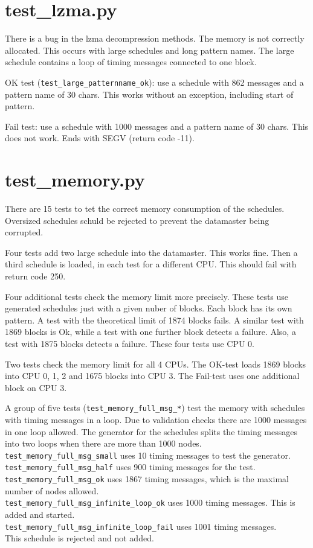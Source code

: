 \documentclass[12pt,a4paper]{report}
\begin{document}
\section{test\_lzma.py}
There is a bug in the lzma decompression methods. The memory is not correctly allocated.
This occurs with large schedules and long pattern names. The large schedule contains
a loop of timing messages connected to one block.

OK test (\texttt{test\_large\_patternname\_ok}): use a schedule with 862 messages and a pattern name of 30 chars.
This works without an exception, including start of pattern.

Fail test: use a schedule with 1000 messages and a pattern name of 30 chars.
This does not work. Ends with SEGV (return code -11).

\section{test\_memory.py}
There are 15 tests to tet the correct memory consumption of the schedules.
Oversized schedules schuld be rejected to prevent the datamaster being corrupted.

Four tests add two large schedule into the datamaster. This works fine.
Then a third schedule is loaded, in each test for a different CPU. This
should fail with return code 250.

Four additional tests check the memory limit more precisely. These tests
use generated schedules just with a given nuber of blocks. Each block
has its own pattern. A test with the theoretical limit of 1874 blocks
fails. A similar test with 1869 blocks is Ok, while a test with one
further block detects a failure. Also, a test with 1875 blocks detects a
failure. These four tests use CPU 0.

Two tests check the memory limit for all 4 CPUs. The OK-test loads 1869
blocks into CPU 0, 1, 2 and 1675 blocks into CPU 3. The Fail-test uses
one additional block on CPU 3.

A group of five tests (\texttt{test\_memory\_full\_msg\_*}) test the memory
with schedules with timing messages in a loop. Due to validation checks there
are 1000 messages in one loop allowed. The generator for the schedules
splits the timing messages into two loops when there are more than 1000 nodes.
\\ \texttt{test\_memory\_full\_msg\_small} uses 10 timing messages to test the generator.
\\ \texttt{test\_memory\_full\_msg\_half} uses 900 timing messages for the test.
\\ \texttt{test\_memory\_full\_msg\_ok} uses 1867 timing messages, which is the maximal number of nodes allowed.
\\ \texttt{test\_memory\_full\_msg\_infinite\_loop\_ok} uses 1000 timing messages. This is added and started.
\\ \texttt{test\_memory\_full\_msg\_infinite\_loop\_fail} uses 1001 timing
messages. \\ This schedule is rejected and not added.
\end{document}
